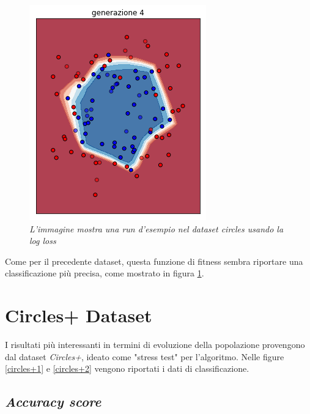 \documentclass[12pt,a4paper]{report}
\begin{document}
\begin{figure}[H]
 \includegraphics[scale = 0.4]{images/circle-rnd-log/4}
 \caption{\textit{L'immagine mostra una run d'esempio nel dataset circles usando la log loss}}
 \label{circles2}
\end{figure}

Come per il precedente dataset, questa funzione di fitness sembra riportare una classificazione più precisa, come mostrato in figura \ref{circles2}.

\newpage

\section{Circles+ Dataset}

I risultati più interessanti in termini di evoluzione della popolazione provengono dal dataset \textit{Circles+}, ideato come "stress test" per l'algoritmo. Nelle figure \ref{circles+1} e \ref{circles+2} vengono riportati i dati di classificazione.

\subsection{\textit{Accuracy score}}
\end{document}
